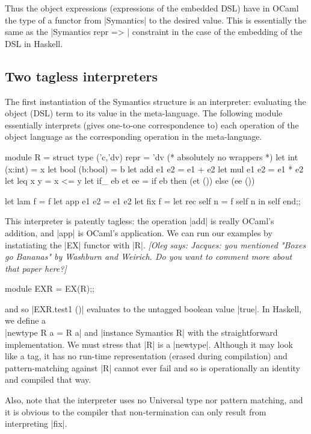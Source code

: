 \documentclass[preprint]{sigplanconf}
\newcommand{\oleg}[1]{{\it [Oleg says: #1]}}
\begin{document}
Thus the object expressions (expressions of the embedded DSL) have in
OCaml the type of a functor from |Symantics| to the desired value. This
is essentially the same as the |Symantics repr => | constraint in the case of
the embedding of the DSL in Haskell.

\subsection{Two tagless interpreters}
The first instantiation of the Symantics structure is an interpreter:
evaluating the object (DSL) term to its value in the meta-language. 
The following module essentially interprets (gives one-to-one
correspondence to) each operation of the object language as the
corresponding operation in the meta-language.
\begin{code}
module R  = struct
  type ('c,'dv) repr = 'dv (* absolutely no wrappers *)
  let int  (x:int)  = x
  let bool (b:bool) = b
  let add  e1 e2    = e1 + e2
  let mul  e1 e2    = e1 * e2
  let leq  x y      = x <= y
  let if_  eb et ee = if eb then (et ()) else (ee ())

  let lam f         = f
  let app e1 e2     = e1 e2
  let fix f         = let rec self n = f self n in self
end;;
\end{code}

This interpreter is patently tagless: the operation |add| is really
OCaml's addition, and |app| is OCaml's application. We can run our
examples by instatiating the |EX| functor with |R|.
\oleg{Jacques: you mentioned "Boxes go Bananas" by Washburn and
  Weirich. Do you want to comment more about that paper here?}

\noindent
\begin{code}
  module EXR = EX(R);;
\end{code}

\noindent and so |EXR.test1 ()| evaluates to the untagged boolean value |true|.
In Haskell, we define a\\
|newtype R a = R a| and |instance Symantics R|
with the straightforward implementation. We must stress that |R| is
a |newtype|. Although it may look like a tag, it has no run-time
representation (erased during compilation) and pattern-matching
against |R| cannot ever fail and so is operationally an identity and
compiled that way.

Also, note that the interpreter uses no Universal type nor pattern
matching, and it is obvious to the compiler that non-termination can
only result from interpreting |fix|.
\end{document}
